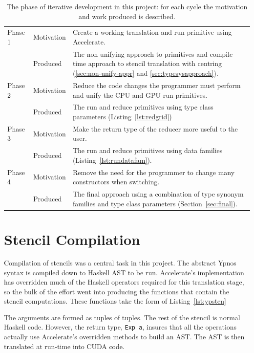 \documentclass[
    12pt,
    a4paper,
    twoside,
    openright,
    ]{scrbook}
\begin{document}
\begin{table}
\begin{tabular}{l l | p{10cm}}
  Phase 1 & Motivation & Create a working translation and run primitive using Accelerate.\\
  & Produced & The non-unifying approach to primitives and compile time approach to stencil translation with centring (\autoref{sec:non-unify-appr} and \autoref{sec:typesysapproach}).
  \\
  Phase 2 & Motivation & Reduce the code changes the programmer must perform and unify the CPU and GPU run primitives.\\
  & Produced & The run and reduce primitives using type class parameters (Listing~\ref{lst:redgrid})
  \\
  Phase 3 & Motivation & Make the return type of the reducer more useful to the user.\\
  & Produced & The run and reduce primitives using data families (Listing~\ref{lst:rundatafam}).
  \\
  Phase 4 & Motivation & Remove the need for the programmer to change many constructors when switching.\\
  & Produced & The final approach using a combination of type synonym families and type class parameters (Section~\ref{sec:final}).
\end{tabular}
\caption{The phase of iterative development in this project: for each cycle the motivation and work produced is described. \label{tbl:iter}}
\end{table}

\section{Stencil Compilation}

Compilation of stencils was a central task in this project. The abstract Ypnos
syntax is compiled down to Haskell AST to be run. Accelerate's implementation
has overridden much of the Haskell operators required for this translation
stage, so the bulk of the effort went into producing the functions that contain
the stencil computations. These functions take the form of
Listing~\ref{lst:ypsten}

The arguments are formed as tuples of tuples. The rest of the stencil is normal
Haskell code. However, the return type, \texttt{Exp a}, insures that all the
operations actually use Accelerate's overridden methods to build an AST. The AST
is then translated at run-time into CUDA code.
\end{document}
